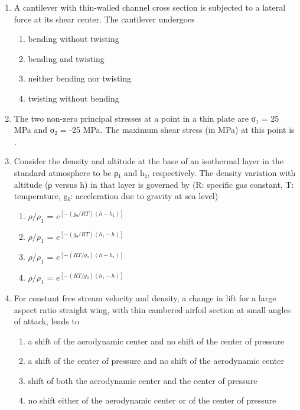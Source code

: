 \documentclass{article}
\begin{document}
\begin{enumerate}
\item A cantilever with thin-walled channel cross section is subjected to a lateral force at its shear center. The cantilever undergoes
\begin{enumerate}
\item bending without twisting
\item bending and twisting
\item neither bending nor twisting
\item twisting without bending
\end{enumerate}

\item The two non-zero principal stresses at a point in a thin plate are σ₁ = 25 MPa and σ₂ = -25 MPa. The maximum shear stress (in MPa) at this point is \underline{\hspace{2cm}}.

\item Consider the density and altitude at the base of an isothermal layer in the standard atmosphere to be ρ₁ and h₁, respectively. The density variation with altitude (ρ versus h) in that layer is governed by (R: specific gas constant, T: temperature, g₀: acceleration due to gravity at sea level)
\begin{multicols}{4}
\begin{enumerate}
\item $\rho/\rho_1$ = $e^{[-(g₀/RT)(h-h₁)]}$
\item $\rho/\rho_1$ = $e^{[-(g₀/RT)(h₁-h)]}$
\item $\rho/\rho_1$ = $e^{[-(RT/g₀)(h-h₁)]}$
\item $\rho/\rho_1$ = $e^{[-(RT/g₀)(h₁-h)]}$
\end{enumerate}
\end{multicols}

\item For constant free stream velocity and density, a change in lift for a large aspect ratio straight wing, with thin cambered airfoil section at small angles of attack, leads to
\begin{enumerate}
\item a shift of the aerodynamic center and no shift of the center of pressure
\item a shift of the center of pressure and no shift of the aerodynamic center
\item shift of both the aerodynamic center and the center of pressure
\item no shift either of the aerodynamic center or of the center of pressure
\end{enumerate}


\end{enumerate}
\end{document}
